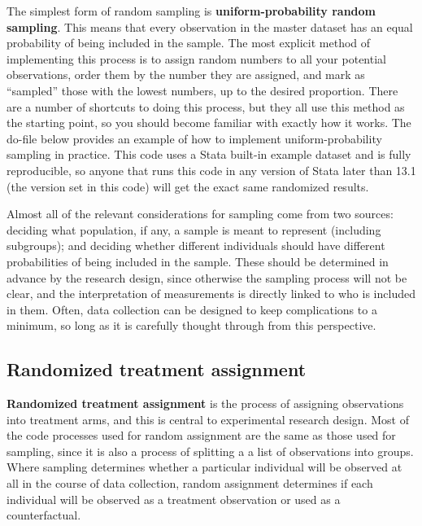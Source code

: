 The simplest form of random sampling is \textbf{uniform-probability random sampling}.
This means that every observation in the master dataset
has an equal probability of being included in the sample.
The most explicit method of implementing this process
is to assign random numbers to all your potential observations,
order them by the number they are assigned,
and mark as ``sampled'' those with the lowest numbers, up to the desired proportion.
There are a number of shortcuts to doing this process,
but they all use this method as the starting point,
so you should become familiar with exactly how it works.
The do-file below provides an example of
how to implement uniform-probability sampling in practice.
This code uses a Stata built-in example dataset and is fully reproducible,
so anyone that runs this code in any version of Stata later than 13.1
(the version set in this code)
will get the exact same randomized results.


Almost all of the relevant considerations for sampling come from two sources:
deciding what population, if any, a sample is meant to represent (including subgroups);
and deciding whether different individuals should have different probabilities
of being included in the sample.
These should be determined in advance by the research design,
since otherwise the sampling process will not be clear,
and the interpretation of measurements is directly linked to who is included in them.
Often, data collection can be designed to keep complications to a minimum,
so long as it is carefully thought through from this perspective.


\subsection{Randomized treatment assignment}

\textbf{Randomized treatment assignment} is the process of assigning observations into treatment arms,
and this is central to experimental research design.
Most of the code processes used for random assignment are the same as those used for sampling,
since it is also a process of splitting a a list of observations into groups.
Where sampling determines whether a particular individual
will be observed at all in the course of data collection,
random assignment determines if each individual will be observed
as a treatment observation or used as a counterfactual.


